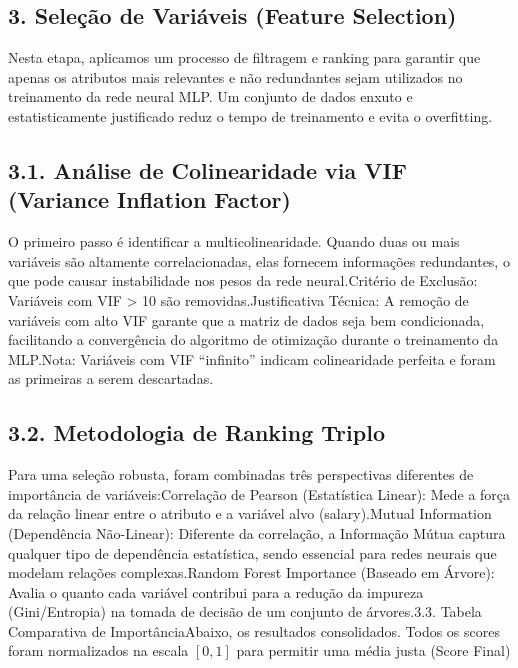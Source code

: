 \documentclass[11pt]{article}
\begin{document}
    \subsection{3. Seleção de Variáveis (Feature
Selection)}\label{seleuxe7uxe3o-de-variuxe1veis-feature-selection}

Nesta etapa, aplicamos um processo de filtragem e ranking para garantir
que apenas os atributos mais relevantes e não redundantes sejam
utilizados no treinamento da rede neural MLP. Um conjunto de dados
enxuto e estatisticamente justificado reduz o tempo de treinamento e
evita o overfitting.

\subsection{3.1. Análise de Colinearidade via VIF (Variance Inflation
Factor)}\label{anuxe1lise-de-colinearidade-via-vif-variance-inflation-factor}

O primeiro passo é identificar a multicolinearidade. Quando duas ou mais
variáveis são altamente correlacionadas, elas fornecem informações
redundantes, o que pode causar instabilidade nos pesos da rede
neural.Critério de Exclusão: Variáveis com VIF \textgreater{} 10 são
removidas.Justificativa Técnica: A remoção de variáveis com alto VIF
garante que a matriz de dados seja bem condicionada, facilitando a
convergência do algoritmo de otimização durante o treinamento da
MLP.Nota: Variáveis com VIF ``infinito'' indicam colinearidade perfeita
e foram as primeiras a serem descartadas.

\subsection{3.2. Metodologia de Ranking
Triplo}\label{metodologia-de-ranking-triplo}

Para uma seleção robusta, foram combinadas três perspectivas diferentes
de importância de variáveis:Correlação de Pearson (Estatística Linear):
Mede a força da relação linear entre o atributo e a variável alvo
(salary).Mutual Information (Dependência Não-Linear): Diferente da
correlação, a Informação Mútua captura qualquer tipo de dependência
estatística, sendo essencial para redes neurais que modelam relações
complexas.Random Forest Importance (Baseado em Árvore): Avalia o quanto
cada variável contribui para a redução da impureza (Gini/Entropia) na
tomada de decisão de um conjunto de árvores.3.3. Tabela Comparativa de
ImportânciaAbaixo, os resultados consolidados. Todos os scores foram
normalizados na escala \([0, 1]\) para permitir uma média justa (Score
Final)
\end{document}
